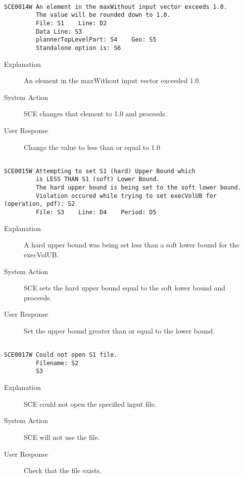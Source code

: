 \hrulefill
\begin{verbatim}

SCE0014W An element in the maxWithout input vector exceeds 1.0.
         The value will be rounded down to 1.0.
         File: S1    Line: D2
         Data Line: S3
         plannerTopLevelPart: S4    Geo: S5
         Standalone option is: S6
\end{verbatim}
\begin{description}
\item[Explanation]  An element in the maxWithout input vector exceeded 1.0.

\item[System Action]  SCE changes that element to 1.0 and proceeds.

\item[User Response]  Change the value to less than or equal to 1.0
\end{description}
\hrulefill
\begin{verbatim}

SCE0015W Attempting to set S1 (hard) Upper Bound which
         is LESS THAN S1 (soft) Lower Bound.
         The hard upper bound is being set to the soft lower bound.
         Violation occured while trying to set execVolUB for (operation, pdf): S2
         File: S3    Line: D4    Period: D5
\end{verbatim}
\begin{description}
\item[Explanation]  A hard upper bound was being set less than a soft lower bound
 for the execVolUB.

\item[System Action]  SCE sets the hard upper bound equal to the soft lower bound
 and proceeds.

\item[User Response]  Set the upper bound greater than or equal to the lower bound.
\end{description}
\hrulefill
\begin{verbatim}

SCE0017W Could not open S1 file.
         Filename: S2
         S3
\end{verbatim}
\begin{description}
\item[Explanation]  SCE could not open the specified input file.

\item[System Action]  SCE will not use the file.

\item[User Response]  Check that the file exists.
\end{description}
